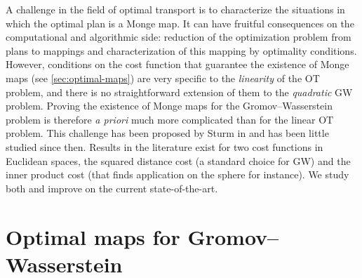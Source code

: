 \label{chap:stage}

A challenge in the field of optimal transport is to characterize the situations in which the optimal plan is a Monge map. It can have fruitful consequences on the computational and algorithmic side: reduction of the optimization problem from plans to mappings and characterization of this mapping by optimality conditions. However, conditions on the cost function that guarantee the existence of Monge maps (see \cref{sec:optimal-maps}) are very specific to the \emph{linearity} of the OT problem, and there is no straightforward extension of them to the \emph{quadratic} GW problem. Proving the existence of Monge maps for the Gromov--Wasserstein problem is therefore \textit{a priori} much more complicated than for the linear OT problem.
This challenge has been proposed by Sturm in \cite{sturm2012space} and has been little studied since then. Results in the literature exist for two cost functions in Euclidean spaces, the squared distance cost (a standard choice for GW) and the inner product cost (that finds application on the sphere for instance). We study both and improve on the current state-of-the-art.


\section{Optimal maps for Gromov--Wasserstein}
